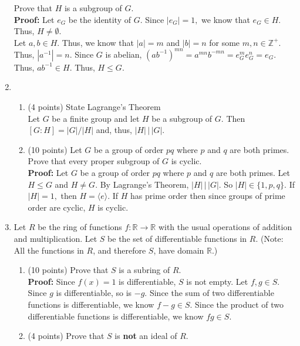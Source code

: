 \documentclass[12pt]{article}
\renewcommand{\emph}[1]{\textsf{\textbf{#1}}}
\newcommand{\bbZ}{\mathbb{Z}}
\newcommand{\bbR}{\mathbb{R}}
\begin{document}
\begin{enumerate}
Prove that $H$ is a subgroup of $G.$\\

\textbf{Proof:} Let $e_G$ be the identity of $G$. Since $|e_G|=1,$ we know that $e_G \in H.$ Thus, $H \not = \emptyset.$\\
Let $a,b \in H.$ Thus, we know that $|a|=m$ and $|b|=n$ for some $m,n \in \bbZ^+.$ Thus, $|a^{-1}|=n.$ Since $G$ is abelian, $(ab^{-1})^{mn}=a^{mn}b^{-mn}=e_G^me_G^n=e_G.$ Thus, $ab^{-1} \in H.$
Thus, $H \leq G.$

\item 
	\begin{enumerate}
	\item ({\small 4 points}) State Lagrange's Theorem\\
	Let $G$ be a finite group and let $H$ be a subgroup of $G.$ Then $[G:H]=|G|/|H|$ and, thus, $|H| \, \big\vert \, |G|.$\\
	\item  ({\small 10 points}) Let $G$ be a group of order $pq$ where $p$ and $q$ are both primes. Prove that every proper subgroup of $G$ is cyclic.\\
	
	\textbf{Proof:} Let $G$ be a group of order $pq$ where $p$ and $q$ are both primes. Let $H \leq G$ and $H \not = G.$ By Lagrange's Theorem, $|H|\, \big\vert \, |G|.$ So $|H| \in \{1,p,q\}$. If $|H|=1,$ then $H=\langle e \rangle.$ If $H$ has prime order then since groups of prime order are cyclic, $H$ is cyclic.\\
	\vfill
	\end{enumerate}

\item Let $R$ be the ring of functions $f: \bbR \to \bbR$ with the usual operations of addition and multiplication. Let $S$ be the set of differentiable functions in $R.$ (Note: All the functions in $R$, and therefore $S$, have domain $\bbR.$)
	\begin{enumerate}
	\item ({\small 10 points}) Prove that $S$ is a subring of $R.$\\
	
	\textbf{Proof:} Since $f(x)=1$ is differentiable, $S$ is not empty.  Let $f, g \in S.$ Since $g$ is differentiable, so is $-g.$ Since the sum of two differentiable functions is differentiable, we know $f-g \in S.$ Since the product of two differentiable functions is differentiable, we know $fg \in S.$
	\vfill
	\item ({\small 4 points}) Prove that $S$ is \emph{not} an ideal of $R.$
	

\end{enumerate}
\end{enumerate}
\end{document}
